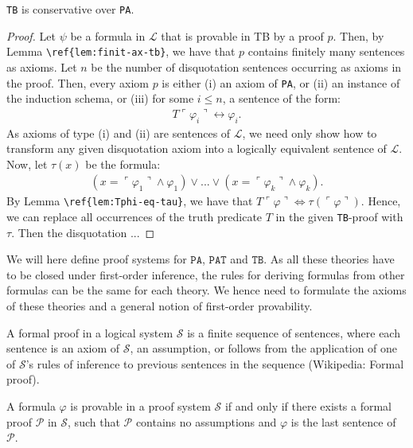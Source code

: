 \begin{theorem}
    \texttt{TB} is conservative over \texttt{PA}.
\end{theorem}

\begin{proof}
Let $\psi$ be a formula in $\mathcal{L}$ that is provable in TB by a proof $p$. Then, by Lemma \verb|\ref{lem:finit-ax-tb}|, we have that $p$ contains finitely many sentences as axioms. Let $n$ be the number of disquotation sentences occurring as axioms in the proof. Then, every axiom $p$ is either (i) an axiom of \texttt{PA}, or (ii) an instance of the induction schema, or (iii) for some $i \leq n$, a sentence of the form: 
\begin{align*}
    T\ulcorner \varphi_i \urcorner \leftrightarrow \varphi_i.
\end{align*}
As axioms of type (i) and (ii) are sentences of $\mathcal{L}$, we need only show how to transform any given disquotation axiom into a logically equivalent sentence of $\mathcal{L}$. Now, let $\tau(x)$ be the formula: 
\begin{align*}
    (x = \ulcorner \varphi_1 \urcorner \land \varphi_1) \lor ... \lor (x = \ulcorner \varphi_k \urcorner \land \varphi_k).
\end{align*}
By Lemma \verb|\ref{lem:Tphi-eq-tau}|, we have that $T\ulcorner \varphi \urcorner \iff \tau(\ulcorner \varphi \urcorner)$. Hence, we can replace all occurrences of the truth predicate $T$ in the given \texttt{TB}-proof with $\tau$. Then the disquotation ...
\end{proof}

We will here define proof systems for $\texttt{PA}$, $\texttt{PAT}$ and $\texttt{TB}$. As all these theories have to be closed under first-order inference, the rules for deriving formulas from other formulas can be the same for each theory. We hence need to formulate the axioms of these theories and a general notion of first-order provability. 

\begin{definition}
    A formal proof in a logical system $\mathcal{S}$ is a finite sequence of sentences, where each sentence is an axiom of $\mathcal{S}$, an assumption, or follows from the application of one of $\mathcal{S}$'s rules of inference to previous sentences in the sequence (Wikipedia: Formal proof).
\end{definition}

\begin{definition}[provability]
    A formula $\varphi$ is provable in a proof system $\mathcal{S}$ if and only if there exists a formal proof $\mathcal{P}$ in $\mathcal{S}$, such that $\mathcal{P}$ contains no assumptions and $\varphi$ is the last sentence of $\mathcal{P}$.
\end{definition}


